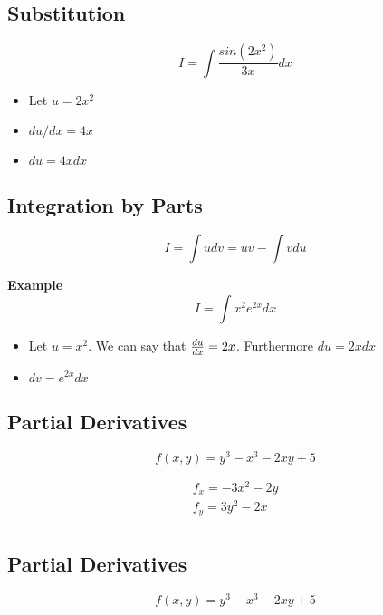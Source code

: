\documentclass[12pt, a4paper]{article}
\begin{document}


\subsection*{Substitution}

\[ I= \int  \frac{sin(2x^2)}{3x} dx \]

\begin{itemize}
\item Let $u = 2x^2$
\item $du/dx = 4x$
\item $du =4x dx$
\end{itemize}


\subsection*{Integration by Parts}

\[ I= \int udv = uv -  \int vdu \]

\textbf{Example}
\[ I= \int x^2 e^{2x} dx \]

\begin{itemize}
\item Let $u = x^2 $. We can say that ${ du \over dx} = 2x$. Furthermore $du=2xdx$
\item $dv  = e^{2x} dx$
\end{itemize}







\subsection*{Partial Derivatives}

\[ f(x,y) = y^3 - x^3 -2xy + 5\]

\begin{eqnarray}
f_x = -3x^2 -2y \\ \nonumber
f_y = 3y^2 -2x \\ \nonumber
\end{eqnarray}


\subsection*{Partial Derivatives}

\[ f(x,y) = y^3 - x^3 -2xy +5\]
\end{document}

